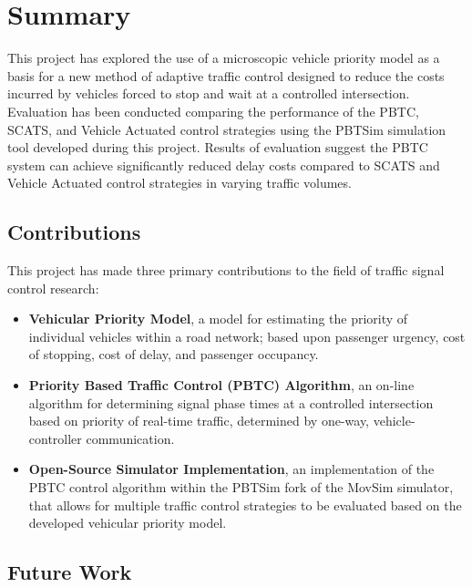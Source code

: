 \chapter{Summary}

This project has explored the use of a microscopic vehicle priority model as a basis for a new method of adaptive traffic control designed to reduce the costs incurred by vehicles forced to stop and wait at a controlled intersection. Evaluation has been conducted comparing the performance of the PBTC, SCATS, and Vehicle Actuated control strategies using the PBTSim simulation tool developed during this project. Results of evaluation suggest the PBTC system can achieve significantly reduced delay costs compared to SCATS and Vehicle Actuated control strategies in varying traffic volumes.


\section{Contributions}

This project has made three primary contributions to the field of traffic signal control research:

\begin{itemize}
\item \textbf{Vehicular Priority Model}, a model for estimating the priority of individual vehicles within a road network; based upon passenger urgency, cost of stopping, cost of delay, and passenger occupancy.
\item \textbf{Priority Based Traffic Control (PBTC) Algorithm}, an on-line algorithm for determining signal phase times at a controlled intersection based on priority of real-time traffic, determined by one-way, vehicle-controller communication. 
\item \textbf{Open-Source Simulator Implementation}, an implementation of the PBTC control algorithm within the PBTSim fork of the MovSim simulator, that allows for multiple traffic control strategies to be evaluated based on the developed vehicular priority model.
\end{itemize}
 
\section{Future Work}

